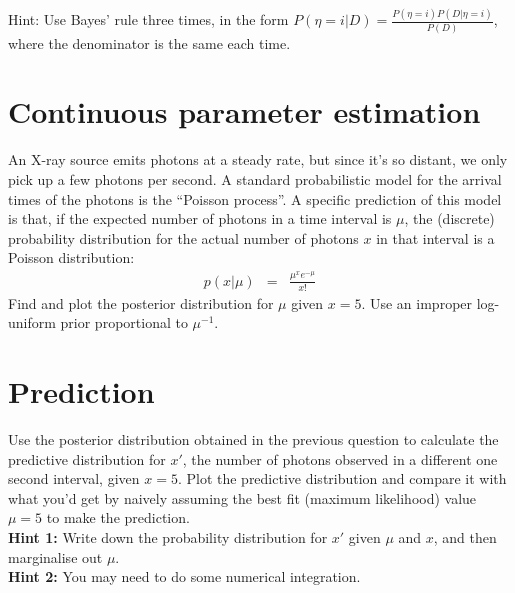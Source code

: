 \documentclass[a4paper, 11pt]{article}
\begin{document}
{\tiny Hint: Use Bayes' rule three times, in the form
$P(\eta = i | D) = \frac{P(\eta=i)P(D|\eta=i)}{P(D)}$, where the denominator is
the same each time.}

\section{Continuous parameter estimation}
An X-ray source emits photons at a steady rate, but since it's so distant, we
only pick up a few photons per second.
A standard probabilistic model for the arrival times of the photons is the
``Poisson process''. A specific prediction of this model is that, if the
expected number of photons in a time interval
is $\mu$, the (discrete) probability distribution for the actual number of photons $x$ in that interval is a Poisson distribution:
\begin{eqnarray}
p(x | \mu) &=& \frac{\mu^x e^{-\mu}}{x!}
\end{eqnarray}
Find and plot the posterior distribution for $\mu$ given $x=5$. Use an improper
log-uniform prior proportional to $\mu^{-1}$.

\section{Prediction}
Use the posterior distribution obtained in the previous question to calculate
the predictive distribution for $x'$, the number of photons observed in a
different one second interval, given $x=5$. Plot the predictive distribution
and compare it with what you'd get by naively assuming the best fit
(maximum likelihood) value $\mu=5$ to make the prediction.\\

{\bf Hint 1: }Write down the probability distribution for $x'$ given
$\mu$ and $x$, and then marginalise out $\mu$.\\

{\bf Hint 2: }You may need to do some numerical integration.
\end{document}
